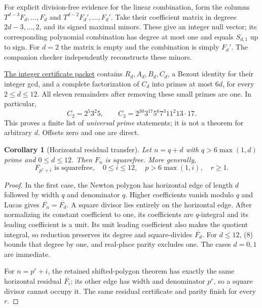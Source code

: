 \documentclass[11pt]{article}
\newtheorem{corollary}[theorem]{Corollary}
\begin{document}
For explicit division-free evidence for the linear combination,
form the columns $T^{d-3}F_d,\ldots,F_d$ and
$T^{d-2}F_d',\ldots,F_d'$. Take their coefficient matrix in degrees
$2d-3,\ldots,2$, and its signed maximal minors. These give an integer
null vector; its corresponding polynomial combination has degree
at most one and equals $S_{d,1}$ up to sign. For $d=2$ the matrix is
empty and the combination is simply $F_d'$.
The companion checker independently reconstructs these minors.

\href{small_kernel_certificates.json}{The integer certificate packet}
contains $R_d,A_d,B_d,C_d$, a Bezout identity for their integer gcd,
and a complete factorization of $C_d$ into primes at most $6d$,
for every $2\le d\le12$. All eleven remainders after removing these
small primes are one. In particular,
\[
 C_2=2^5 3^2 5,\qquad
 C_3=2^{30}3^{17}5^6 7^3 11^2 13\cdot17. \tag{9}
\]
This proves a finite list of \emph{universal prime} statements; it is
not a theorem for arbitrary $d$. Offsets zero and one are direct.

\begin{corollary}[Horizontal residual transfer]\label{cor:horizontal}
Let $n=q+d$ with $q>6\max(1,d)$ prime and $0\le d\le12$.
Then $F_n$ is squarefree. More generally,
\[
 \boxed{F_{p^r+i}\text{ is squarefree},\quad
 0\le i\le12,\quad p>6\max(1,i),\quad r\ge1.} \tag{10}
\]
\end{corollary}
\begin{proof}
In the first case, the Newton polygon has horizontal edge of length
$d$ followed by width $q$ and denominator $q$. Higher coefficients
vanish modulo $q$ and Lucas gives
$\overline{F_n}=\overline{F_d}$. A square divisor lies entirely on the
horizontal edge. After normalizing its constant coefficient to one,
its coefficients are $q$-integral and its leading coefficient is a
unit. Its unit leading coefficient also makes the quotient integral,
so reduction preserves its degree and square-divides $\overline{F_d}$. For $d\le12$, (8) bounds that degree by one, and
real-place parity excludes one. The cases $d=0,1$ are immediate.

For $n=p^r+i$, the retained shifted-polygon theorem has exactly the
same horizontal residual $\overline{F_i}$; its other edge has width
and denominator $p^r$, so a square divisor cannot occupy it. The
same residual certificate and parity finish for every $r$.
\end{proof}
\end{document}
